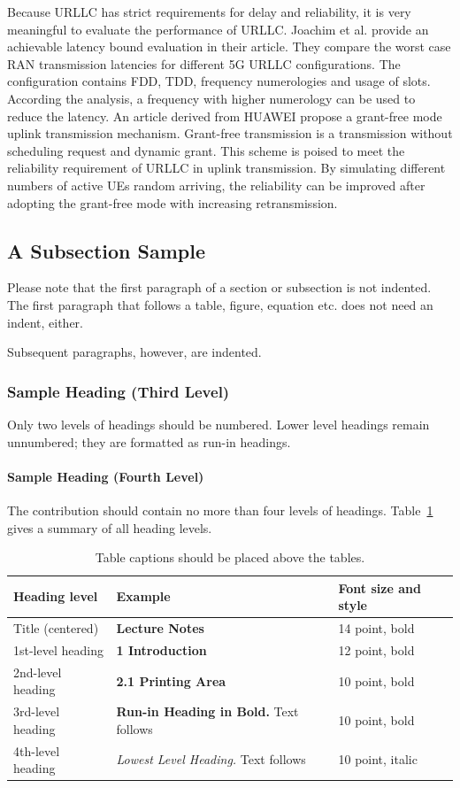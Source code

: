 \documentclass[runningheads]{llncs}
\begin{document}
Because URLLC has strict requirements for delay and reliability, it is very meaningful to evaluate the performance of URLLC.
Joachim et al. provide an achievable latency bound evaluation in their article\cite{joachim}.
They compare the worst case RAN transmission latencies for different 5G URLLC configurations.
The configuration contains FDD, TDD, frequency numerologies and usage of slots.
According the analysis, a frequency with higher numerology can be used to reduce the latency.
An article derived from HUAWEI propose a grant-free mode uplink transmission mechanism\cite{Huawei}.
Grant-free transmission is a transmission without scheduling request and dynamic grant.
This scheme is poised to meet the reliability requirement of URLLC in uplink transmission.
By simulating different numbers of active UEs random arriving, the reliability can be improved after adopting the grant-free mode with increasing retransmission.

\subsection{A Subsection Sample}
Please note that the first paragraph of a section or subsection is
not indented. The first paragraph that follows a table, figure,
equation etc. does not need an indent, either.

Subsequent paragraphs, however, are indented.

\subsubsection{Sample Heading (Third Level)} Only two levels of
headings should be numbered. Lower level headings remain unnumbered;
they are formatted as run-in headings.

\paragraph{Sample Heading (Fourth Level)}
The contribution should contain no more than four levels of
headings. Table~\ref{tab1} gives a summary of all heading levels.

\begin{table}
\caption{Table captions should be placed above the
tables.}\label{tab1}
\begin{tabular}{|l|l|l|}
\hline
Heading level &  Example & Font size and style\\
\hline
Title (centered) &  {\Large\bfseries Lecture Notes} & 14 point, bold\\
1st-level heading &  {\large\bfseries 1 Introduction} & 12 point, bold\\
2nd-level heading & {\bfseries 2.1 Printing Area} & 10 point, bold\\
3rd-level heading & {\bfseries Run-in Heading in Bold.} Text follows & 10 point, bold\\
4th-level heading & {\itshape Lowest Level Heading.} Text follows & 10 point, italic\\
\hline
\end{tabular}
\end{table}
\end{document}
